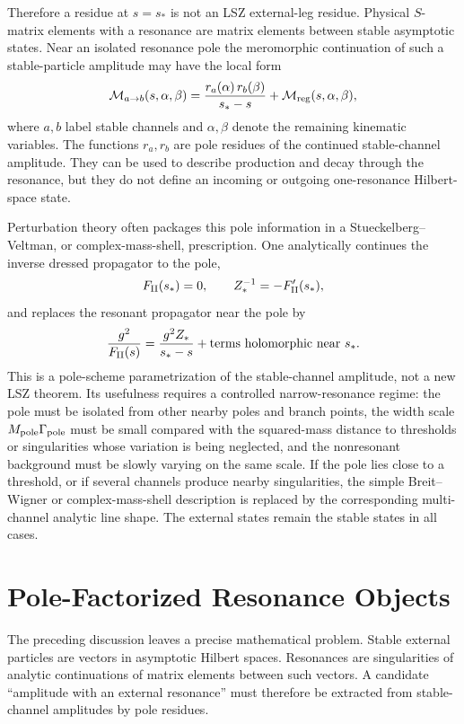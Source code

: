 Therefore a residue at \(s=s_\ast\) is not an LSZ external-leg residue.
Physical \(S\)-matrix elements with a resonance are matrix elements between
stable asymptotic states.  Near an isolated resonance pole the meromorphic
continuation of such a stable-particle amplitude may have the local form
\[
  \mathcal M_{a\to b}(s,\alpha,\beta)
  =
  \frac{r_{a}(\alpha)\,r_{b}(\beta)}{s_\ast-s}
  +
  \mathcal M_{\rm reg}(s,\alpha,\beta),
\]
where \(a,b\) label stable channels and \(\alpha,\beta\) denote the remaining
kinematic variables.  The functions \(r_a,r_b\) are pole residues of the
continued stable-channel amplitude.  They can be used to describe production
and decay through the resonance, but they do not define an incoming or
outgoing one-resonance Hilbert-space state.

Perturbation theory often packages this pole information in a
Stueckelberg--Veltman, or complex-mass-shell, prescription.  One analytically
continues the inverse dressed propagator to the pole,
\[
  F_{\rm II}(s_\ast)=0,
  \qquad
  Z_\ast^{-1}= -F_{\rm II}'(s_\ast),
\]
and replaces the resonant propagator near the pole by
\[
  \frac{g^2}{F_{\rm II}(s)}
  =
  \frac{g^2 Z_\ast}{s_\ast-s}
  +
  \text{terms holomorphic near }s_\ast .
\]
This is a pole-scheme parametrization of the stable-channel amplitude, not a
new LSZ theorem.  Its usefulness requires a controlled narrow-resonance
regime: the pole must be isolated from other nearby poles and branch points,
the width scale \(M_{\rm pole}\Gamma_{\rm pole}\) must be small compared with
the squared-mass distance to thresholds or singularities whose variation is
being neglected, and the nonresonant background must be slowly varying on the
same scale.  If the pole lies close to a threshold, or if several channels
produce nearby singularities, the simple Breit--Wigner or complex-mass-shell
description is replaced by the corresponding multi-channel analytic line
shape.  The external states remain the stable states in all cases.

\section{Pole-Factorized Resonance Objects}

The preceding discussion leaves a precise mathematical problem.  Stable
external particles are vectors in asymptotic Hilbert spaces.  Resonances are
singularities of analytic continuations of matrix elements between such
vectors.  A candidate ``amplitude with an external resonance'' must therefore
be extracted from stable-channel amplitudes by pole residues.


